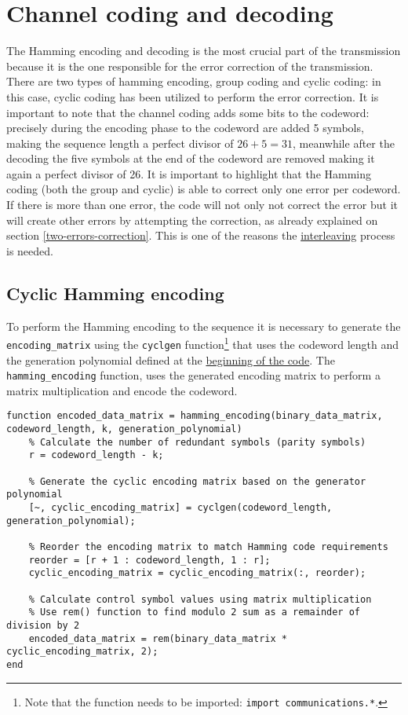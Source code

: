 \vspace{40px} \section{Channel coding and decoding}
The Hamming encoding and decoding is the most crucial part of the transmission because it is the one responsible for the error correction of the transmission. There are two types of hamming encoding, group coding and cyclic coding: in this case, cyclic coding has been utilized to perform the error correction. It is important to note that the channel coding adds some bits to the codeword: precisely during the encoding phase to the codeword are added 5 symbols, making the sequence length a perfect divisor of $26 + 5 = 31$, meanwhile after the decoding the five symbols at the end of the codeword are removed making it again a perfect divisor of 26. It is important to highlight that the Hamming coding (both the group and cyclic) is able to correct only one error per codeword. If there is more than one error, the code will not only not correct the error but it will create other errors by attempting the correction, as already explained on section \ref{two-errors-correction}. This is one of the reasons the \hyperref[interleaving-process]{interleaving} process is needed.





\subsection{Cyclic Hamming encoding}\label{hamming-encoding}
To perform the Hamming encoding to the sequence it is necessary to generate the \texttt{encoding\_matrix} using the \texttt{cyclgen} function\footnote{Note that the function needs to be imported: \texttt{import communications.*}.} that uses the codeword length and the generation polynomial defined at the \hyperref[initial-parameters]{beginning of the code}. The \texttt{hamming\_encoding} function, uses the generated encoding matrix to perform a matrix multiplication and encode the codeword.

\begin{lstlisting}
function encoded_data_matrix = hamming_encoding(binary_data_matrix, codeword_length, k, generation_polynomial)
    % Calculate the number of redundant symbols (parity symbols)
    r = codeword_length - k;
    
    % Generate the cyclic encoding matrix based on the generator polynomial
    [~, cyclic_encoding_matrix] = cyclgen(codeword_length, generation_polynomial);
    
    % Reorder the encoding matrix to match Hamming code requirements
    reorder = [r + 1 : codeword_length, 1 : r];
    cyclic_encoding_matrix = cyclic_encoding_matrix(:, reorder);
    
    % Calculate control symbol values using matrix multiplication
    % Use rem() function to find modulo 2 sum as a remainder of division by 2
    encoded_data_matrix = rem(binary_data_matrix * cyclic_encoding_matrix, 2);
end
\end{lstlisting}


